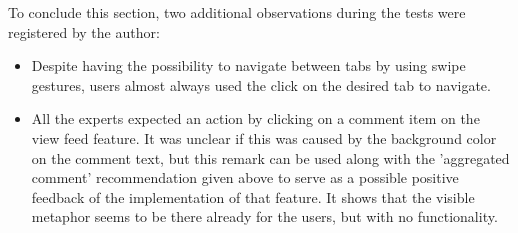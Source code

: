To conclude this section, two additional observations during the tests were registered by the author:

\begin{itemize}
\item Despite having the possibility to navigate between tabs by using swipe gestures, users almost always used the click on the desired tab to navigate.
\item All the experts expected an action by clicking on a comment item on the view feed feature. It was unclear if this was caused by the background color on the comment text, but this remark can be used along with the 'aggregated comment' recommendation given above to serve as a possible positive feedback of the implementation of that feature. It shows that the visible metaphor seems to be there already for the users, but with no functionality.
\end{itemize}